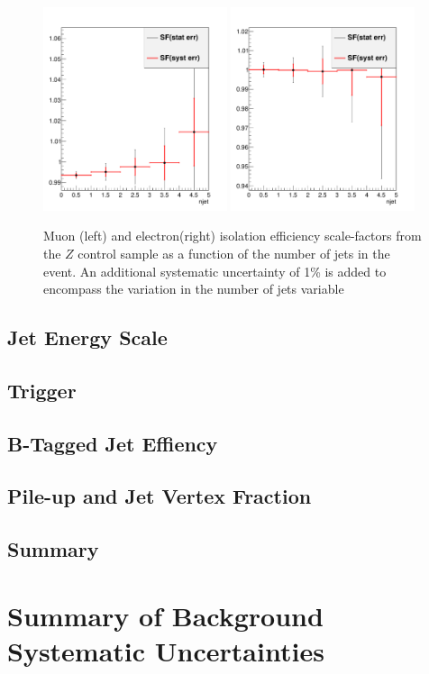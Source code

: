 \begin{figure}[htbp]
\begin{center}
\includegraphics[width=0.48\textwidth]{figs/systematics/MuTP_sf_njet_ALP}
\includegraphics[width=0.48\textwidth]{figs/systematics/EleTP_sf_njet_ALP}
\caption{Muon (left) and electron(right) isolation efficiency scale-factors from the $Z$ control sample as a function of the number of jets in the event. An additional systematic uncertainty of 1\% is added to encompass the variation in the number of jets variable}
\label{figure:systematics_iso}
\end{center}
\end{figure}


\subsection{Jet Energy Scale}
\subsection{Trigger}
\subsection{B-Tagged Jet Effiency}
\subsection{Pile-up and Jet Vertex Fraction}
\subsection{Summary}
\section{Summary of Background Systematic Uncertainties}




